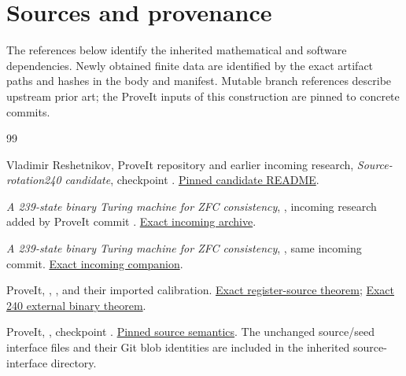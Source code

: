 \section{Sources and provenance}

The references below identify the inherited mathematical and software
dependencies. Newly obtained finite data are identified by the exact
artifact paths and hashes in the body and manifest. Mutable branch
references describe upstream prior art; the ProveIt inputs of this
construction are pinned to concrete commits.

\begin{thebibliography}{99}
\raggedright
{}
Vladimir Reshetnikov, ProveIt repository and earlier incoming research,
\emph{Source-rotation240 candidate}, checkpoint
.
\href{https://github.com/VladimirReshetnikov/ProveIt/blob/ce192939372ac7944fe2a0208c68a96d49fb5e3b/Computability/BusyBeaver/Research/ZFC/candidate-rotation240/README.md}{Pinned candidate README}.

\emph{A 239-state binary Turing machine for ZFC consistency},
, incoming research
added by ProveIt commit
.
\href{https://github.com/VladimirReshetnikov/ProveIt/blob/83fd3585484e5dffb37992f91f7dd4d3e70c437a/docs/incoming/ZFC_239_State_Construction_2026-10-19.zip}{Exact incoming archive}.

\emph{A 239-state binary Turing machine for ZFC consistency},
, same incoming commit.
\href{https://github.com/VladimirReshetnikov/ProveIt/blob/83fd3585484e5dffb37992f91f7dd4d3e70c437a/docs/incoming/ZFC239_Companion_2026-10-19.zip}{Exact incoming companion}.

ProveIt, ,
, and their imported calibration.
\href{https://github.com/VladimirReshetnikov/ProveIt/blob/ce192939372ac7944fe2a0208c68a96d49fb5e3b/Computability/BusyBeaver/Lean/BusyBeaver/ZFC/CalibratedRotation240.lean}{Exact register-source theorem};
\href{https://github.com/VladimirReshetnikov/ProveIt/blob/ce192939372ac7944fe2a0208c68a96d49fb5e3b/Computability/BusyBeaver/Lean/BusyBeaver/ZFC/BinaryRotation240.lean}{Exact 240 external binary theorem}.

ProveIt, , checkpoint
.
\href{https://github.com/VladimirReshetnikov/ProveIt/blob/13ec39ed43148b1807f51ed6e6528e1c84659562/Computability/BusyBeaver/Lean/BusyBeaver/ZFC/RegisterPath.lean}{Pinned source semantics}.
The unchanged source/seed interface files and their Git blob identities
are included in the inherited source-interface directory.


\end{thebibliography}
